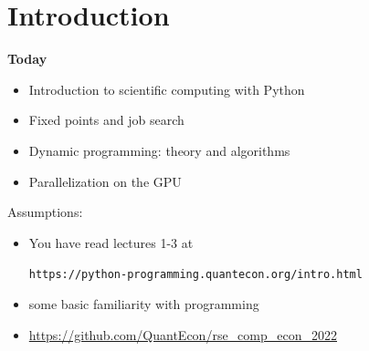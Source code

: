 


\subtitle{Introduction (and why Python?)}

\author{John Stachurski}


\date{September 2022}




\begin{frame}
  \titlepage
\end{frame}





\section{Introduction}



\begin{frame}

    \textbf{Today}

    \begin{itemize}
        \item Introduction to scientific computing with Python
        \vspace{0.5em}
        \vspace{0.5em}
        \item Fixed points and job search 
        \vspace{0.5em}
        \vspace{0.5em}
        \item Dynamic programming: theory and algorithms
        \vspace{0.5em}
        \vspace{0.5em}
        \item Parallelization on the GPU 
    \end{itemize}

\end{frame}




\begin{frame}


    Assumptions:

    \begin{itemize}
        \item You have read lectures 1-3 at
            \begin{center}
                \texttt{https://python-programming.quantecon.org/intro.html}
            \end{center}
        \vspace{0.3em}
        \item some basic familiarity with programming
    \end{itemize}

    \begin{itemize}
        \item \url{https://github.com/QuantEcon/rse_comp_econ_2022}
    \end{itemize}


\end{frame}




